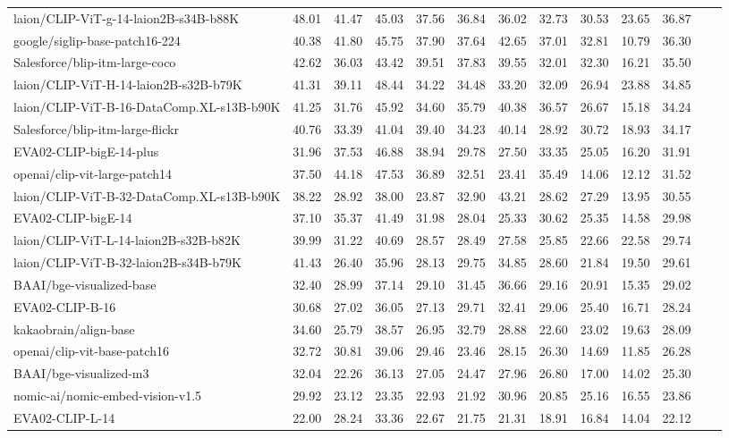 \begin{table*}
{\begin{tabular}{lcccccccccccc}
laion/CLIP-ViT-g-14-laion2B-s34B-b88K &48.01 &41.47 &45.03 &37.56 &36.84 &36.02 &32.73 &30.53 &23.65 &36.87 \\
google/siglip-base-patch16-224 &40.38 &41.80 &45.75 &37.90 &37.64 &42.65 &37.01 &32.81 &10.79 &36.30 \\
Salesforce/blip-itm-large-coco &42.62 &36.03 &43.42 &39.51 &37.83 &39.55 &32.01 &32.30 &16.21 &35.50 \\
laion/CLIP-ViT-H-14-laion2B-s32B-b79K &41.31 &39.11 &48.44 &34.22 &34.48 &33.20 &32.09 &26.94 &23.88 &34.85 \\
laion/CLIP-ViT-B-16-DataComp.XL-s13B-b90K &41.25 &31.76 &45.92 &34.60 &35.79 &40.38 &36.57 &26.67 &15.18 &34.24 \\
Salesforce/blip-itm-large-flickr &40.76 &33.39 &41.04 &39.40 &34.23 &40.14 &28.92 &30.72 &18.93 &34.17 \\
EVA02-CLIP-bigE-14-plus &31.96 &37.53 &46.88 &38.94 &29.78 &27.50 &33.35 &25.05 &16.20 &31.91 \\
openai/clip-vit-large-patch14 &37.50 &44.18 &47.53 &36.89 &32.51 &23.41 &35.49 &14.06 &12.12 &31.52 \\
laion/CLIP-ViT-B-32-DataComp.XL-s13B-b90K &38.22 &28.92 &38.00 &23.87 &32.90 &43.21 &28.62 &27.29 &13.95 &30.55 \\
EVA02-CLIP-bigE-14 &37.10 &35.37 &41.49 &31.98 &28.04 &25.33 &30.62 &25.35 &14.58 &29.98 \\
laion/CLIP-ViT-L-14-laion2B-s32B-b82K &39.99 &31.22 &40.69 &28.57 &28.49 &27.58 &25.85 &22.66 &22.58 &29.74 \\
laion/CLIP-ViT-B-32-laion2B-s34B-b79K &41.43 &26.40 &35.96 &28.13 &29.75 &34.85 &28.60 &21.84 &19.50 &29.61 \\
BAAI/bge-visualized-base &32.40 &28.99 &37.14 &29.10 &31.45 &36.66 &29.16 &20.91 &15.35 &29.02 \\
EVA02-CLIP-B-16 &30.68 &27.02 &36.05 &27.13 &29.71 &32.41 &29.06 &25.40 &16.71 &28.24 \\
kakaobrain/align-base &34.60 &25.79 &38.57 &26.95 &32.79 &28.88 &22.60 &23.02 &19.63 &28.09 \\
openai/clip-vit-base-patch16 &32.72 &30.81 &39.06 &29.46 &23.46 &28.15 &26.30 &14.69 &11.85 &26.28 \\
BAAI/bge-visualized-m3 &32.04 &22.26 &36.13 &27.05 &24.47 &27.96 &26.80 &17.00 &14.02 &25.30 \\
nomic-ai/nomic-embed-vision-v1.5 &29.92 &23.12 &23.35 &22.93 &21.92 &30.96 &20.85 &25.16 &16.55 &23.86 \\
EVA02-CLIP-L-14 &22.00 &28.24 &33.36 &22.67 &21.75 &21.31 &18.91 &16.84 &14.04 &22.12 \\

\end{tabular}}
\end{table*}

